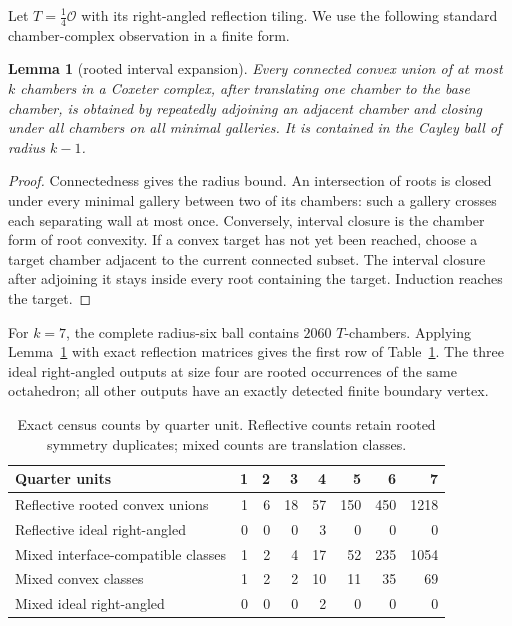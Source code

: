 \documentclass[11pt]{article}
\newtheorem{lemma}[theorem]{Lemma}
\theoremstyle{remark}
\newcommand{\OO}{\mathcal O}
\begin{document}
Let $T=\tfrac14\OO$ with its right-angled reflection tiling.  We use the
following standard chamber-complex observation in a finite form.

\begin{lemma}[rooted interval expansion]\label{lem:interval}
Every connected convex union of at most $k$ chambers in a Coxeter complex,
after translating one chamber to the base chamber, is obtained by repeatedly
adjoining an adjacent chamber and closing under all chambers on all minimal
galleries.  It is contained in the Cayley ball of radius $k-1$.
\end{lemma}

\begin{proof}
Connectedness gives the radius bound.  An intersection of roots is closed
under every minimal gallery between two of its chambers: such a gallery
crosses each separating wall at most once.  Conversely, interval closure is
the chamber form of root convexity.  If a convex target has not yet been
reached, choose a target chamber adjacent to the current connected subset.
The interval closure after adjoining it stays inside every root containing
the target.  Induction reaches the target.
\end{proof}

For $k=7$, the complete radius-six ball contains $2060$ $T$-chambers.
Applying Lemma~\ref{lem:interval} with exact reflection matrices gives the
first row of Table~\ref{tab:counts}.  The three ideal right-angled outputs at
size four are rooted occurrences of the same octahedron; all other outputs
have an exactly detected finite boundary vertex.

\begin{table}[ht]
\centering
\caption{Exact census counts by quarter unit.  Reflective counts retain
rooted symmetry duplicates; mixed counts are translation classes.}
\label{tab:counts}
\begin{tabular}{lrrrrrrr}
\toprule
Quarter units &1&2&3&4&5&6&7\\
\midrule
Reflective rooted convex unions &1&6&18&57&150&450&1218\\
Reflective ideal right-angled &0&0&0&3&0&0&0\\
Mixed interface-compatible classes &1&2&4&17&52&235&1054\\
Mixed convex classes &1&2&2&10&11&35&69\\
Mixed ideal right-angled &0&0&0&2&0&0&0\\
\bottomrule
\end{tabular}
\end{table}
\end{document}
